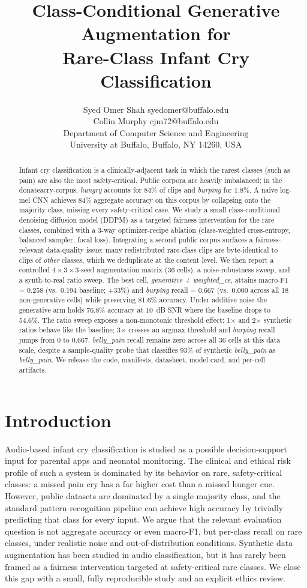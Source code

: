 \documentclass[10pt]{article}
\title{Class-Conditional Generative Augmentation for\\Rare-Class Infant Cry Classification}
\author{%
  \name Syed Omer Shah \email syedomer@buffalo.edu \\
  \AND
  \name Collin Murphy \email cjm72@buffalo.edu \\
  \addr Department of Computer Science and Engineering\\
  University at Buffalo, Buffalo, NY 14260, USA
}
\begin{document}
\maketitle

\begin{abstract}
Infant cry classification is a clinically-adjacent task in which the rarest classes (such as pain) are also the most safety-critical. Public corpora are heavily imbalanced; in the donateacry-corpus, \textit{hungry} accounts for 84\% of clips and \textit{burping} for 1.8\%. A naive log-mel CNN achieves 84\% aggregate accuracy on this corpus by collapsing onto the majority class, missing every safety-critical case. We study a small class-conditional denoising diffusion model (DDPM) as a targeted fairness intervention for the rare classes, combined with a 3-way optimizer-recipe ablation (class-weighted cross-entropy, balanced sampler, focal loss). Integrating a second public corpus surfaces a fairness-relevant data-quality issue: many redistributed rare-class clips are byte-identical to clips of \emph{other} classes, which we deduplicate at the content level. We then report a controlled $4 \times 3 \times 3$-seed augmentation matrix (36 cells), a noise-robustness sweep, and a synth-to-real ratio sweep. The best cell, \textit{generative + weighted\_ce}, attains macro-F1 = 0.258 (vs.\ 0.194 baseline; +33\%) and \textit{burping} recall = 0.667 (vs.\ 0.000 across all 18 non-generative cells) while preserving 81.6\% accuracy. Under additive noise the generative arm holds 76.8\% accuracy at 10~dB SNR where the baseline drops to 54.6\%. The ratio sweep exposes a non-monotonic threshold effect: 1$\times$ and 2$\times$ synthetic ratios behave like the baseline; 3$\times$ crosses an argmax threshold and \textit{burping} recall jumps from 0 to 0.667. \textit{belly\_pain} recall remains zero across all 36 cells at this data scale, despite a sample-quality probe that classifies 93\% of synthetic \textit{belly\_pain} as \textit{belly\_pain}. We release the code, manifests, datasheet, model card, and per-cell artifacts.
\end{abstract}

\section{Introduction}\label{sec:intro}
Audio-based infant cry classification is studied as a possible decision-support input for parental apps and neonatal monitoring. The clinical and ethical risk profile of such a system is dominated by its behavior on rare, safety-critical classes: a missed pain cry has a far higher cost than a missed hunger cue. However, public datasets are dominated by a single majority class, and the standard pattern recognition pipeline can achieve high accuracy by trivially predicting that class for every input. We argue that the relevant evaluation question is not aggregate accuracy or even macro-F1, but per-class recall on rare classes, under realistic noise and out-of-distribution conditions. Synthetic data augmentation has been studied in audio classification, but it has rarely been framed as a fairness intervention targeted at safety-critical rare classes. We close this gap with a small, fully reproducible study and an explicit ethics review.
\end{document}
